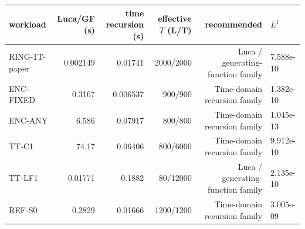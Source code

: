 \begin{tabular}{lrrrrl}
\toprule
 workload & Luca/GF (s) & time recursion (s) & effective $T$ (L/T) & recommended & $L^1$ \\
\midrule
RING-1T-paper & 0.002149 & 0.01741 & 2000/2000 & Luca / generating-function family & 7.588e-10 \\
ENC-FIXED & 0.3167 & 0.006537 & 900/900 & Time-domain recursion family & 1.382e-10 \\
ENC-ANY & 6.586 & 0.07917 & 800/800 & Time-domain recursion family & 1.045e-13 \\
TT-C1 & 74.17 & 0.06406 & 800/6000 & Time-domain recursion family & 9.912e-10 \\
TT-LF1 & 0.01771 & 0.1882 & 80/12000 & Luca / generating-function family & 2.135e-10 \\
REF-S0 & 0.2829 & 0.01666 & 1200/1200 & Time-domain recursion family & 3.005e-09 \\
\bottomrule
\end{tabular}
